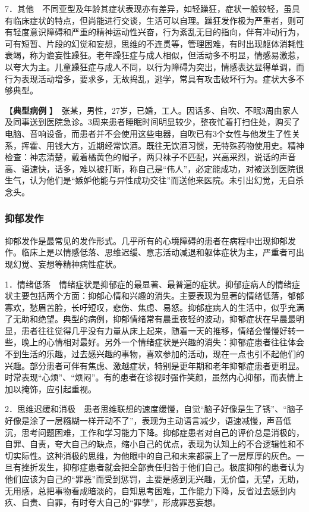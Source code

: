7．其他　不同亚型及年龄其症状表现亦有差异，如轻躁狂，症状一般较轻，虽具有临床症状的特点，但尚能进行交谈，生活可以自理。躁狂发作极为严重者，则可有轻度意识障碍和严重的精神运动性兴奋，行为紊乱无目的指向，伴有冲动行为，可有短暂、片段的幻觉和妄想，思维的不连贯等，管理困难，有时出现躯体消耗性衰竭，称为谵妄性躁狂。老年躁狂症与成人相似，但活动多不明显，情感易激惹，以夸大为主。儿童躁狂症与成人不同，以行为障碍为突出，情感表达显得单调，而行为表现活动增多，要求多，无故捣乱，逃学，常具有攻击破坏行为。症状大多不够典型。

【\textbf{典型病例}
】　{张某，男性，27岁，已婚，工人。因话多、自吹、不眠3周由家人及同事送到医院急诊。3周来患者睡眠时间明显较少，整夜忙着打扫住处，购买了电脑、音响设备，而患者并不会使用这些电器，自吹已有3个女性与他发生了性关系，挥霍、用钱大方，近期经常饮酒。既往无饮酒习惯，无特殊药物使用史。精神检查：神志清楚，戴着橘黄色的帽子，两只袜子不匹配，兴高采烈，说话的声音高、语速快，话多，难以被打断，称自己是``伟人''，必定能成功，对被送到医院很生气，认为他们是``嫉妒他能与异性成功交往''而送他来医院。未引出幻觉，无自杀念头。}

\subsubsection{抑郁发作}

抑郁发作是最常见的发作形式。几乎所有的心境障碍的患者在病程中出现抑郁发作。临床上是以情感低落、思维迟缓、意志活动减退和躯体症状为主，严重者可出现幻觉、妄想等精神病性症状。

1．情绪低落　情绪症状是抑郁症的最显著、最普遍的症状。抑郁症病人的情绪症状主要包括两个方面：抑郁心情和兴趣的消失。主要表现为显著的情绪低落，郁郁寡欢，愁眉苦脸，长吁短叹，悲伤、焦虑、易怒。抑郁症病人的生活中，似乎充满了无助和绝望。典型的病例，抑郁情绪常有晨重夜轻的波动，抑郁症状在早晨最明显，患者往往觉得几乎没有力量从床上起来，随着一天的推移，情绪会慢慢好转一些，晚上的心情相对最好。另外一个情绪症状是兴趣的消失：抑郁症患者往往体会不到生活的乐趣，过去感兴趣的事物，喜欢参加的活动，现在一点也引不起他们的兴趣。部分患者可伴有焦虑、激越症状，特别是更年期和老年抑郁症患者更明显。时常表现``心烦''、``烦闷''。有的患者在诊视时强作笑颜，虽然内心抑郁，而表情上加以掩饰，应引起重视。

2．思维迟缓和消极　患者思维联想的速度缓慢，自觉``脑子好像是生了锈''、``脑子好像是涂了一层糨糊一样开动不了''，表现为主动语言减少，语速减慢，声音低沉，思考问题困难，工作和学习能力下降。抑郁症患者对自己的评价总是消极的，自罪、自责，夸大自己的缺点，缩小自己的优点，表现为认知上的不合逻辑性和不切实际性。这种消极的思维，为他眼中的自己和未来都蒙上了一层厚厚的灰色。一旦有挫折发生，抑郁症患者就会把全部责任归咎于他们自己。极度抑郁的患者认为他们应该为自己的``罪恶''而受到惩罚，主要是感到无兴趣，无价值，无望，无助，无用感，总把事物看成暗淡的，自知思考困难，工作能力下降，反省过去感到内疚、自责、自罪，有时夸大自己的``罪孽''，形成罪恶妄想。

